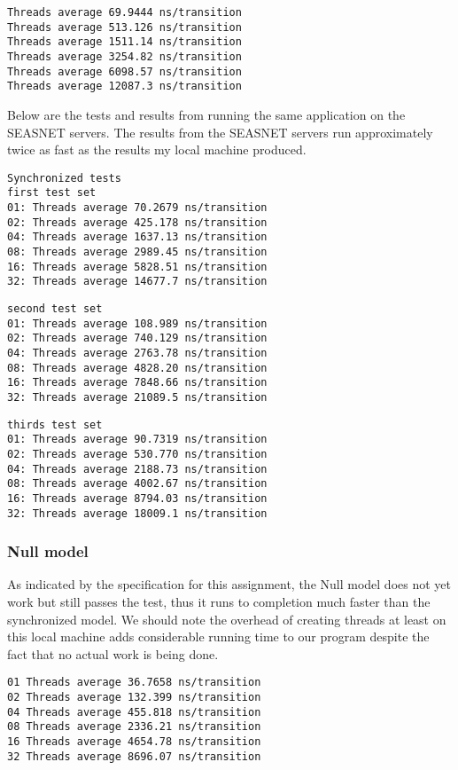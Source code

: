 \documentclass[11pt]{article}
\begin{document}
\begin{verbatim}
Threads average 69.9444 ns/transition
Threads average 513.126 ns/transition
Threads average 1511.14 ns/transition
Threads average 3254.82 ns/transition
Threads average 6098.57 ns/transition
Threads average 12087.3 ns/transition
\end{verbatim}

Below are the tests and results from running the same
application on the SEASNET servers. The results from
the SEASNET servers run approximately twice as fast
as the results my local machine produced. 

\begin{verbatim}
Synchronized tests
first test set
01: Threads average 70.2679 ns/transition
02: Threads average 425.178 ns/transition
04: Threads average 1637.13 ns/transition
08: Threads average 2989.45 ns/transition
16: Threads average 5828.51 ns/transition
32: Threads average 14677.7 ns/transition
\end{verbatim}

\begin{verbatim}
second test set
01: Threads average 108.989 ns/transition
02: Threads average 740.129 ns/transition
04: Threads average 2763.78 ns/transition
08: Threads average 4828.20 ns/transition
16: Threads average 7848.66 ns/transition
32: Threads average 21089.5 ns/transition
\end{verbatim}

\begin{verbatim}
thirds test set
01: Threads average 90.7319 ns/transition
02: Threads average 530.770 ns/transition
04: Threads average 2188.73 ns/transition
08: Threads average 4002.67 ns/transition
16: Threads average 8794.03 ns/transition
32: Threads average 18009.1 ns/transition
\end{verbatim}


\subsubsection{Null model}
\label{sec-2-3-2}
As indicated by the specification for this assignment, the
Null model does not yet work but still passes the test,
thus it runs to completion much faster than the synchronized
model. We should note the overhead of creating threads
at least on this local machine adds considerable running
time to our program despite the fact that no actual work
is being done.

\begin{verbatim}
01 Threads average 36.7658 ns/transition
02 Threads average 132.399 ns/transition
04 Threads average 455.818 ns/transition
08 Threads average 2336.21 ns/transition
16 Threads average 4654.78 ns/transition
32 Threads average 8696.07 ns/transition
\end{verbatim}
\end{document}
